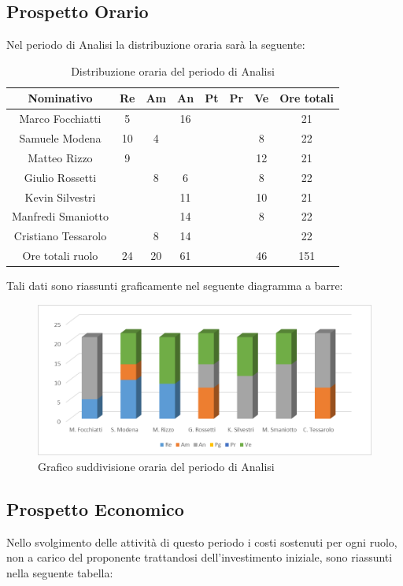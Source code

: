 \documentclass[./PianodiProgetto.tex]{subfiles}
\begin{document}
\subsection{Prospetto Orario}
Nel periodo di Analisi la distribuzione oraria sarà la seguente:

\begin{table}[H]
	\centering
	\begin{tabular}{|c|cccccc|c|}
		\hline
		Nominativo&Re&Am&An&Pt&Pr&Ve&Ore totali\\ \hline
		Marco Focchiatti&5& &16& & & &21 \\ \hline
		Samuele Modena&10&4& & & &8&22 \\ \hline
		Matteo Rizzo&9& & & & &12&21 \\ \hline
		Giulio Rossetti& &8&6& & &8&22 \\ \hline
		Kevin Silvestri& & &11& & &10&21 \\ \hline
		Manfredi Smaniotto& & &14& & &8&22 \\ \hline
		Cristiano Tessarolo& &8&14& & & &22 \\  \hline
		Ore totali ruolo&24&20&61& & &46&151 \\ \hline
	\end{tabular}
\caption{Distribuzione oraria del periodo di Analisi}
\end{table}

Tali dati sono riassunti graficamente nel seguente diagramma a barre:
\begin{figure}[H]
	\centering
	\includegraphics[width=1\linewidth]{img/grafici/AnalisiProspettoOrario}
	\caption{Grafico suddivisione oraria del periodo di Analisi}
	\label{fig:analisi-prospetto-orario}
\end{figure}

\subsection{Prospetto Economico}
Nello svolgimento delle attività di questo periodo i costi sostenuti per ogni ruolo, non a carico del proponente trattandosi dell’investimento iniziale, sono riassunti nella seguente tabella:
\end{document}
